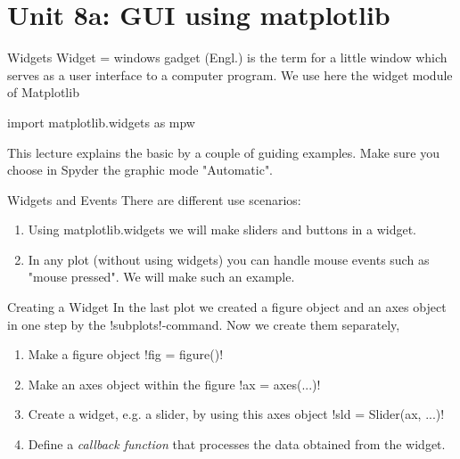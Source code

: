 \documentclass[hyperref={pdfpagelabels=false},table]{beamer}
\date{}
\begin{document}
\part{Unit 8a: GUI using matplotlib}



\begin{frame}[fragile]{Widgets}
\vfill
Widget = windows gadget  (Engl.) is the term for a little window which serves as a user interface to
a computer program.
\vfill
We use here the widget module of Matplotlib
\begin{python}
 import matplotlib.widgets as mpw
\end{python}
This lecture explains the basic by a couple of guiding examples. Make sure you choose
in Spyder the graphic mode "Automatic".
\end{frame}

\begin{frame}[fragile]{Widgets and Events}
There are different use scenarios:
\begin{enumerate}
\item Using matplotlib.widgets we will make sliders and buttons in a widget.
\item In any plot (without using widgets) you can handle mouse events such as "mouse
pressed". We will make such an example.
\end{enumerate}
\end{frame}
\begin{frame}[fragile]{Creating a Widget}
In the last plot we created a figure object and an axes object in one step by the \pyth!subplots!-command.
Now we create them separately,
\begin{enumerate}
\item Make a figure object \pyth!fig = figure()!
\item Make an axes object within the figure \pyth!ax = axes(...)!
\item Create a widget, e.g. a slider,  by using this axes object \pyth!sld = Slider(ax, ...)!
\item Define a \emph{callback function}  that processes the data obtained from the widget.
\end{enumerate}
\end{frame}
\end{document}
